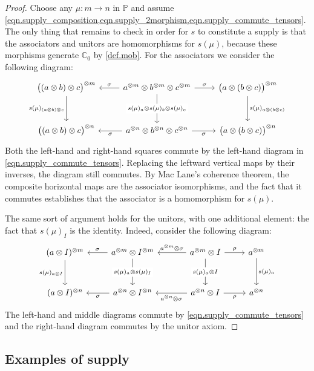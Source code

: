 \documentclass[11pt, oneside, article]{memoir}
\theoremstyle{plain}
\theoremstyle{definition}
\theoremstyle{remark}
\newcommand{\tpow}[1]{^{\otimes #1}}
\newcommand{\cc}{\mathbb{C}}
\newcommand{\pp}{\mathbb{P}}
\newcommand{\mob}[1]{#1_0}
\begin{document}
\begin{proof}
Choose any $\mu\colon m\to n$ in $\pp$ and assume \cref{eqn.supply_composition,eqn.supply_2morphism,eqn.supply_commute_tensors}. The only thing that remains to check in order for $s$ to constitute a supply is that the associators and unitors are homomorphisms for $s(\mu)$, because these morphisms generate $\mob{\cc}$ by \cref{def.mob}. For the associators we consider the following diagram:
\[
\begin{tikzcd}[row sep=30pt]
  \big((a\otimes b)\otimes c\big)\tpow{m}\ar[d, "s(\mu)_{(a\otimes b)\otimes c}"']&
  a\tpow{m}\otimes b\tpow{m}\otimes c\tpow{m}\ar[l, "\sigma"']\ar[r, "\sigma"]\ar[d, "s(\mu)_a\otimes s(\mu)_b\otimes s(\mu)_c" description]&
  \big(a\otimes (b\otimes c)\big)\tpow{m}\ar[d, "s(\mu)_{a\otimes (b\otimes c)}"]\\
  \big((a\otimes b)\otimes c\big)\tpow{n}&
  a\tpow{n}\otimes b\tpow{n}\otimes c\tpow{n}\ar[l, "\sigma"]\ar[r, "\sigma"']&
  \big(a\otimes (b\otimes c)\big)\tpow{n}
\end{tikzcd}
\]
Both the left-hand and right-hand squares commute by the left-hand diagram in \cref{eqn.supply_commute_tensors}. Replacing the leftward vertical maps by their inverses, the diagram still commutes. By Mac Lane's coherence theorem, the composite horizontal maps are the associator isomorphisms, and the fact that it commutes establishes that the associator is a homomorphism for $s(\mu)$.

The same sort of argument holds for the unitors, with one additional element: the fact that $s(\mu)_I$ is the identity. Indeed, consider the following diagram:
\[
\begin{tikzcd}[row sep=30pt]
	(a\otimes I)\tpow{m}\ar[d, "s(\mu)_{a\otimes I}"']&
	a\tpow{m}\otimes I\tpow{m}\ar[d, "s(\mu)_a\otimes s(\mu)_I" description]\ar[l, "\sigma"']&[10pt]
	a\tpow{m}\otimes I\ar[d, "s(\mu)_a\otimes I" description]\ar[r, "\rho"]\ar[l, "a\tpow{m}\otimes\sigma"']&
	a\tpow{m}\ar[d, "s(\mu)_a"]\\
	(a\otimes I)\tpow{n}&
	a\tpow{n}\otimes I\tpow{n}\ar[l, "\sigma"]&
	a\tpow{n}\otimes I\ar[l, "a\tpow{n}\otimes\sigma"]\ar[r, "\rho"']&
	a\tpow{n}
\end{tikzcd}
\]
The left-hand and middle diagrams commute by \cref{eqn.supply_commute_tensors} and the right-hand diagram commutes by the unitor axiom.
\end{proof}

\subsection{Examples of supply}
\end{document}

